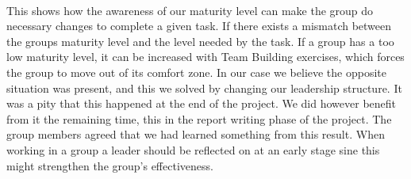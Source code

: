\\
This shows how the awareness of our maturity level can make the group do necessary changes to complete a given task. If there exists a mismatch between the groups maturity level and the level needed by the task. If a group has a too low maturity level, it can be increased with Team Building exercises, which forces the group to move out of its comfort zone. In our case we believe the opposite situation was present, and this we solved by changing our leadership structure. It was a pity that this happened at the end of the project. We did however benefit from it the remaining time, this in the report writing phase of the project. The group members agreed that we had learned something from this result. When working in a group a leader should be reflected on at an early stage sine this might strengthen the group’s effectiveness. 
\\

